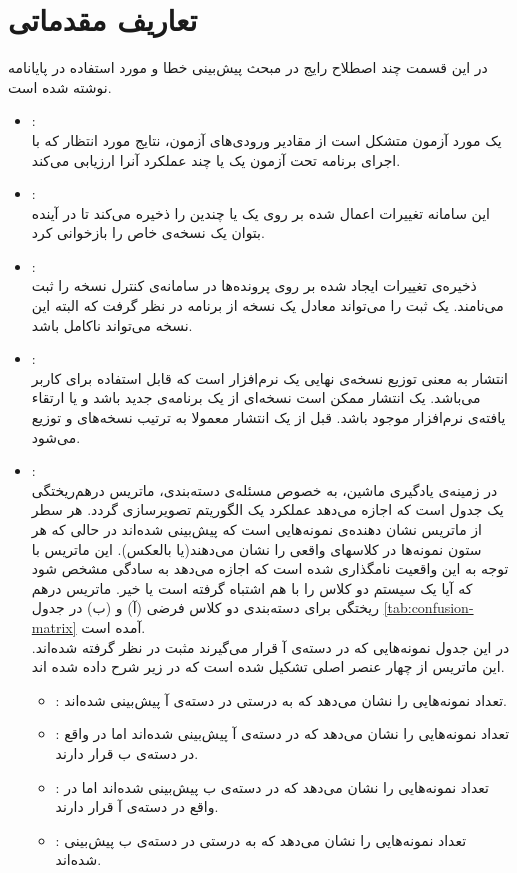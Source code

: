 \section{ تعاریف مقدماتی}
\label{sec:terms}
در این قسمت چند اصطلاح رایج در مبحث پیش‌بینی‌ خطا و مورد استفاده در پایانامه نوشته شده است.
\begin{itemize}
	\item 
	: \\
	یک مورد آزمون متشکل است از مقادیر ورودی‌های آزمون، نتایج مورد انتظار که با اجرای برنامه تحت آزمون یک یا چند عملکرد آنرا ارزیابی می‌کند. 
	\item
	:\\
	این سامانه تغییرات اعمال شده بر روی یک یا چندین  را ذخیره می‌کند تا در آینده بتوان یک نسخه‌ی خاص را بازخوانی کرد. 
	\item
	:\\
	ذخیره‌ی تغییرات ایجاد شده بر روی پرونده‌ها در سامانه‌ی کنترل نسخه‌ را ثبت می‌نامند. یک ثبت را می‌تواند معادل یک نسخه از برنامه در نظر گرفت که البته این نسخه می‌تواند ناکامل باشد.
	\item
	:\\
	انتشار به معنی توزیع نسخه‌ی نهایی یک نرم‌افزار است که قابل استفاده برای کاربر می‌باشد. یک انتشار ممکن است نسخه‌ای از یک برنامه‌ی جدید باشد و یا ارتقاء یافته‌ی نرم‌افزار موجود باشد. قبل از یک انتشار معمولا به ترتیب نسخه‌های  و  توزیع می‌شود. 
	\item
	:\\
	در زمینه‌ی یادگیری ماشین، به خصوص مسئله‌ی دسته‌بندی، ماتریس درهم‌ریختگی یک جدول است که اجازه می‌دهد عملکرد یک الگوریتم تصویر‌سازی گردد. هر سطر از ماتریس نشان دهنده‌ی نمونه‌هایی است که پیش‌بینی شده‌اند در حالی که هر ستون نمونه‌ها در کلاسهای واقعی را نشان می‌دهند(یا بالعکس). این ماتریس با توجه به این واقعیت نامگذاری شده است که اجازه می‌دهد به سادگی مشخص شود که آیا یک سیستم دو کلاس را با هم اشتباه گرفته است یا خیر. ماتریس درهم ریختگی برای دسته‌بندی دو کلاس فرضی (آ) و (ب) در جدول \ref{tab:confusion-matrix} آمده است. \\
	در این جدول نمونه‌هایی که در دسته‌ی آ قرار می‌گیرند مثبت در نظر گرفته شده‌اند. این ماتریس از چهار عنصر اصلی تشکیل شده است که در زیر شرح داده شده اند. 
	\begin{itemize}
		\item 
		: تعداد نمونه‌هایی را نشان می‌دهد که به درستی در دسته‌ی آ پیش‌بینی شده‌اند.
		\item
		: تعداد نمونه‌هایی را نشان می‌دهد که در دسته‌ی آ پیش‌بینی شده‌اند اما در واقع در دسته‌ی ب قرار دارند.
		\item
		: تعداد نمونه‌هایی را نشان می‌دهد که در دسته‌ی ب پیش‌بینی شده‌اند اما در واقع در دسته‌ی آ قرار دارند.
		\item
		: تعداد نمونه‌هایی را نشان می‌دهد که به درستی در دسته‌ی ب پیش‌بینی شده‌اند.
	\end{itemize}
	
\end{itemize}	

